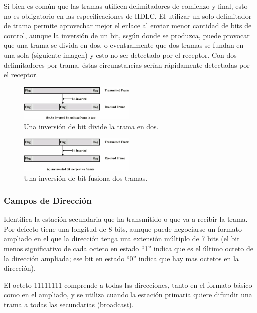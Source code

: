 \documentclass[withindex,glossary]{cam-thesis}
\begin{document}
Si bien es común que las tramas utilicen delimitadores de comienzo y final, esto no es obligatorio en las especificaciones de HDLC.
El utilizar un solo delimitador de trama permite aprovechar mejor el enlace al enviar menor cantidad de bits de control, aunque la inversión de un bit, según donde se produzca, puede provocar que una trama se divida en dos, o eventualmente que dos tramas se fundan en una sola (siguiente imagen) y esto no ser detectado por el receptor. Con dos delimitadores por trama, éstas circunstancias serían rápidamente detectadas por el receptor.

\begin{figure}[H]
\centering
\includegraphics[width=0.5\textwidth]{images/HDLC_InvertedBit1}
\caption[Una inversión de bit divide la trama en 2]{Una inversión de bit divide la trama en dos.}
\end{figure}

\begin{figure}[H]
\centering
\includegraphics[width=0.5\textwidth]{images/HDLC_InvertedBit2}
\caption[Una inversión de bit fusiona dos tramas]{Una inversión de bit fusiona dos tramas.}
\end{figure}

\subsubsection{Campos de Dirección}
Identifica la estación secundaria que ha transmitido o que va a recibir la trama.
Por defecto tiene una longitud de 8 bits, aunque puede negociarse un formato ampliado en el que la dirección tenga una extensión múltiplo de 7 bits (el bit menos significativo de cada octeto en estado “1” indica que es el último octeto de la dirección ampliada; ese bit en estado “0” indica que hay mas octetos en la dirección). 

El octeto 11111111 comprende a todas las direcciones, tanto en el formato básico como en el ampliado, y se utiliza cuando la estación primaria quiere difundir una trama a todas las secundarias (broadcast).
\end{document}
